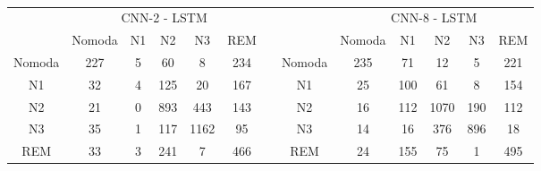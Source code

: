 \documentclass[12pt,paper=A4]{report}
\begin{document}
\begin{table}[H]
\centering
\caption{}
\captionsetup{justification=centering}
\begin{tabular}{cccccclcccccc}
\multicolumn{1}{l}{} & \multicolumn{5}{c}{CNN-2 - LSTM} &  & \multicolumn{1}{l}{} & \multicolumn{5}{c}{CNN-8 - LSTM} \\ \cline{2-6} \cline{9-13} 
\multicolumn{1}{l|}{} & \multicolumn{1}{c|}{Nomoda} & \multicolumn{1}{c|}{N1} & \multicolumn{1}{c|}{N2} & \multicolumn{1}{c|}{N3} & \multicolumn{1}{c|}{REM} &  & \multicolumn{1}{l|}{} & \multicolumn{1}{c|}{Nomoda} & \multicolumn{1}{c|}{N1} & \multicolumn{1}{c|}{N2} & \multicolumn{1}{c|}{N3} & \multicolumn{1}{c|}{REM} \\ \cline{1-6} \cline{8-13} 
\multicolumn{1}{|c|}{Nomoda} & \multicolumn{1}{c|}{\cellcolor[HTML]{FFFFC7}227} & \multicolumn{1}{c|}{5} & \multicolumn{1}{c|}{60} & \multicolumn{1}{c|}{8} & \multicolumn{1}{c|}{234} & \multicolumn{1}{l|}{} & \multicolumn{1}{c|}{Nomoda} & \multicolumn{1}{c|}{\cellcolor[HTML]{FFFFC7}235} & \multicolumn{1}{c|}{71} & \multicolumn{1}{c|}{12} & \multicolumn{1}{c|}{5} & \multicolumn{1}{c|}{221} \\ \cline{1-6} \cline{8-13} 
\multicolumn{1}{|c|}{N1} & \multicolumn{1}{c|}{32} & \multicolumn{1}{c|}{\cellcolor[HTML]{FFFFC7}4} & \multicolumn{1}{c|}{125} & \multicolumn{1}{c|}{20} & \multicolumn{1}{c|}{167} & \multicolumn{1}{l|}{} & \multicolumn{1}{c|}{N1} & \multicolumn{1}{c|}{25} & \multicolumn{1}{c|}{\cellcolor[HTML]{FFFFC7}100} & \multicolumn{1}{c|}{61} & \multicolumn{1}{c|}{8} & \multicolumn{1}{c|}{154} \\ \cline{1-6} \cline{8-13} 
\multicolumn{1}{|c|}{N2} & \multicolumn{1}{c|}{21} & \multicolumn{1}{c|}{0} & \multicolumn{1}{c|}{\cellcolor[HTML]{FFFFC7}893} & \multicolumn{1}{c|}{443} & \multicolumn{1}{c|}{143} & \multicolumn{1}{l|}{} & \multicolumn{1}{c|}{N2} & \multicolumn{1}{c|}{16} & \multicolumn{1}{c|}{112} & \multicolumn{1}{c|}{\cellcolor[HTML]{FFFFC7}1070} & \multicolumn{1}{c|}{190} & \multicolumn{1}{c|}{112} \\ \cline{1-6} \cline{8-13} 
\multicolumn{1}{|c|}{N3} & \multicolumn{1}{c|}{35} & \multicolumn{1}{c|}{1} & \multicolumn{1}{c|}{117} & \multicolumn{1}{c|}{\cellcolor[HTML]{FFFFC7}1162} & \multicolumn{1}{c|}{95} & \multicolumn{1}{l|}{} & \multicolumn{1}{c|}{N3} & \multicolumn{1}{c|}{14} & \multicolumn{1}{c|}{16} & \multicolumn{1}{c|}{376} & \multicolumn{1}{c|}{\cellcolor[HTML]{FFFFC7}896} & \multicolumn{1}{c|}{18} \\ \cline{1-6} \cline{8-13} 
\multicolumn{1}{|c|}{REM} & \multicolumn{1}{c|}{33} & \multicolumn{1}{c|}{3} & \multicolumn{1}{c|}{241} & \multicolumn{1}{c|}{7} & \multicolumn{1}{c|}{\cellcolor[HTML]{FFFFC7}466} & \multicolumn{1}{l|}{} & \multicolumn{1}{c|}{REM} & \multicolumn{1}{c|}{24} & \multicolumn{1}{c|}{155} & \multicolumn{1}{c|}{75} & \multicolumn{1}{c|}{1} & \multicolumn{1}{c|}{\cellcolor[HTML]{FFFFC7}495} \\ \cline{1-6} \cline{8-13} 

\end{tabular}
\label{matrixOfConf2v}
\end{table}
\end{document}
